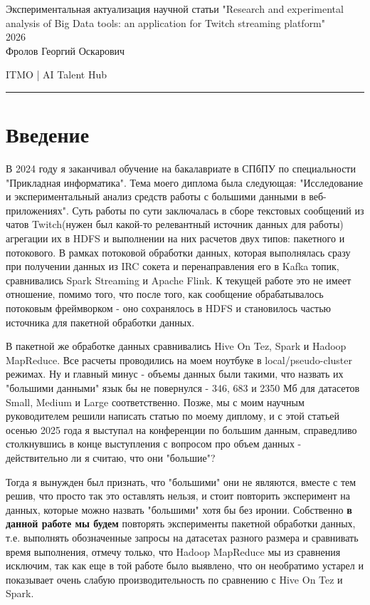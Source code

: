 \documentclass[12pt,letterpaper, onecolumn]{exam}
\begin{document}
\begingroup  
    \centering
    \LARGE Экспериментальная актуализация научной статьи "Research and experimental analysis of Big Data tools: an application for Twitch streaming platform" \\[0.5em]
    \large  2026\\[0.5em]
    \large Фролов Георгий Оскарович\par
    \large ITMO | AI Talent Hub\par
\endgroup
\rule{\textwidth}{0.7pt}
\pointsdroppedatright   %
\printanswers
\renewcommand{\solutiontitle}{\noindent\textbf{Ans:}\enspace}   %

\section{Введение}

В 2024 году я заканчивал обучение на бакалавриате в СПбПУ по специальности "Прикладная информатика". Тема моего диплома была следующая: "Исследование и экспериментальный анализ средств работы с большими данными в веб-приложениях". Суть работы по сути заключалась в сборе текстовых сообщений из чатов Twitch(нужен был какой-то релевантный источник данных для работы) агрегации их в HDFS и выполнении на них расчетов двух типов: пакетного и потокового. В рамках потоковой обработки данных, которая выполнялась сразу при получении данных из IRC сокета и перенаправления его в Kafka топик, сравнивались Spark Streaming и Apache Flink. К текущей работе это не имеет отношение, помимо того, что после того, как сообщение обрабатывалось потоковым фреймворком - оно сохранялось в HDFS и становилось частью источника для пакетной обработки данных.

В пакетной же обработке данных сравнивались Hive On Tez, Spark и Hadoop MapReduce. Все расчеты проводились на моем ноутбуке в local/pseudo-cluster режимах. Ну и главный минус - объемы данных были такими, что назвать их "большими данными" язык бы не повернулся - 346, 683 и 2350 Мб для датасетов Small, Medium и Large соответственно. Позже, мы с моим научным руководителем решили написать статью по моему диплому, и с этой статьей осенью 2025 года я выступал на конференции по большим данным, справедливо столкнувшись в конце выступления с вопросом про объем данных - действительно ли я считаю, что они "большие"?

Тогда я вынужден был признать, что "большими" они не являются, вместе с тем решив, что просто так это оставлять нельзя, и стоит повторить эксперимент на данных, которые можно назвать "большими" хотя бы без иронии. Собственно \textbf{в данной работе мы будем} повторять эксперименты пакетной обработки данных, т.е. выполнять обозначенные запросы на датасетах разного размера и сравнивать время выполнения, отмечу только, что Hadoop MapReduce мы из сравнения исключим, так как еще в той работе было выявлено, что он необратимо устарел и показывает очень слабую производительность по сравнению с Hive On Tez и Spark.
\end{document}
